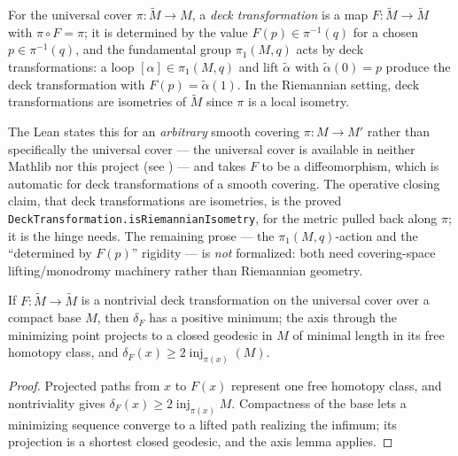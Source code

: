 \begin{definition}
  \label{def:pet-ch6-deck-transformation}


  For the universal cover $\pi:\tilde M\to M$, a \emph{deck transformation} is
  a map $F:\tilde M\to\tilde M$ with $\pi\circ F=\pi$; it is determined by the
  value $F(p)\in\pi^{-1}(q)$ for a chosen $p\in\pi^{-1}(q)$, and the
  fundamental group $\pi_1(M,q)$ acts by deck transformations: a loop
  $[\alpha]\in\pi_1(M,q)$ and lift $\tilde\alpha$ with
  $\tilde\alpha(0)=p$ produce the deck transformation with
  $F(p)=\tilde\alpha(1)$. In the Riemannian setting, deck transformations are
  isometries of $\tilde M$ since $\pi$ is a local isometry.

  The Lean states this for an \emph{arbitrary} smooth covering $\pi:M\to M'$
  rather than specifically the universal cover --- the universal cover is
  available in neither Mathlib nor this project (see
  ) --- and takes $F$ to be a diffeomorphism,
  which is automatic for deck transformations of a smooth covering. The
  operative closing claim, that deck transformations are isometries, is the
  proved \texttt{DeckTransformation.isRiemannianIsometry}, for the metric
  pulled back along $\pi$; it is the hinge 
  needs. The remaining prose --- the $\pi_1(M,q)$-action and the ``determined by
  $F(p)$'' rigidity --- is \emph{not} formalized: both need covering-space
  lifting/monodromy machinery rather than Riemannian geometry.
\end{definition}

\begin{lemma}
  \label{lem:pet-ch6-deck-transformation-dilation}

  If $F:\tilde M\to\tilde M$ is a nontrivial deck transformation on the
  universal cover over a compact base $M$, then $\delta_F$ has a positive
  minimum; the axis through the minimizing point projects to a closed
  geodesic in $M$ of minimal length in its free homotopy class, and
  $\delta_F(x)\ge2\operatorname{inj}_{\pi(x)}(M)$.
\end{lemma}
\begin{proof}
  \sketch
  Projected paths from \(x\) to \(F(x)\) represent one free homotopy class, and nontriviality gives \(\delta_F(x)\ge2\operatorname{inj}_{\pi(x)}M\). Compactness of the base lets a minimizing sequence converge to a lifted path realizing the infimum; its projection is a shortest closed geodesic, and the axis lemma applies.
\end{proof}

